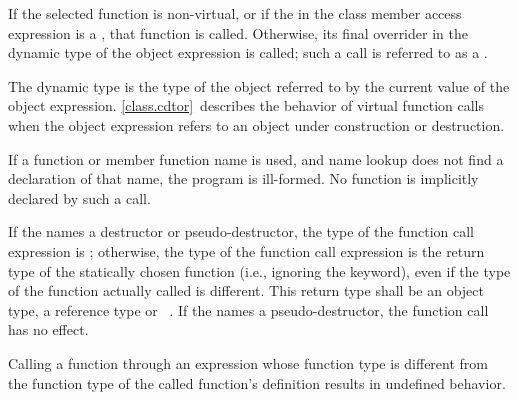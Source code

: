 \pnum
If the selected
function is non-virtual, or if the  in the class
member access expression is a , that function is
called. Otherwise, its final overrider in the dynamic type
of the object expression is called; such a call is referred to as a
.
\begin{note}
The dynamic type is the type of the object referred to by the
current value of the object expression. \ref{class.cdtor}~describes the
behavior of virtual function calls when the object expression
refers to
an object under construction or destruction.
\end{note}

\pnum
\begin{note}
If a function or member function name is used, and name
lookup does not find a declaration of that name,
the program is ill-formed. No function is implicitly declared by such a
call.
\end{note}

\pnum
If the  names
a destructor or pseudo-destructor,
the type of the function call expression is ; otherwise, the
type of the function call expression is the return type of the
statically chosen function (i.e., ignoring the  keyword),
even if the type of the function actually called is different.
%
This return type shall be an object type, a reference type or \cv{}~.
If the  names a pseudo-destructor,
the function call has no effect.

\pnum
Calling a function through an
expression whose function type is different
from the function type of the called function's
definition results in undefined behavior.

